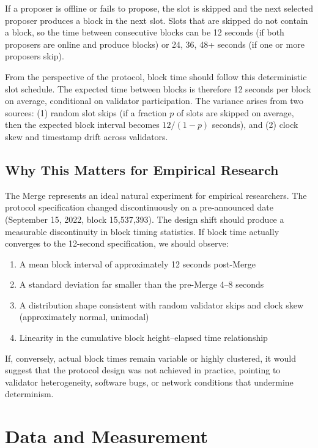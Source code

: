 \documentclass[12pt]{article}
\begin{document}
If a proposer is offline or fails to propose, the slot is skipped and the next selected proposer produces a block in the next slot. Slots that are skipped do not contain a block, so the time between consecutive blocks can be 12 seconds (if both proposers are online and produce blocks) or 24, 36, 48+ seconds (if one or more proposers skip).

From the perspective of the protocol, block time should follow this deterministic slot schedule. The expected time between blocks is therefore 12 seconds per block on average, conditional on validator participation. The variance arises from two sources: (1) random slot skips (if a fraction $p$ of slots are skipped on average, then the expected block interval becomes $12 / (1 - p)$ seconds), and (2) clock skew and timestamp drift across validators.

\subsection{Why This Matters for Empirical Research}

The Merge represents an ideal natural experiment for empirical researchers. The protocol specification changed discontinuously on a pre-announced date (September 15, 2022, block 15,537,393). The design shift should produce a measurable discontinuity in block timing statistics. If block time actually converges to the 12-second specification, we should observe:
\begin{enumerate}
\item A mean block interval of approximately 12 seconds post-Merge
\item A standard deviation far smaller than the pre-Merge 4–8 seconds
\item A distribution shape consistent with random validator skips and clock skew (approximately normal, unimodal)
\item Linearity in the cumulative block height–elapsed time relationship
\end{enumerate}

If, conversely, actual block times remain variable or highly clustered, it would suggest that the protocol design was not achieved in practice, pointing to validator heterogeneity, software bugs, or network conditions that undermine determinism.

\section{Data and Measurement}
\end{document}
